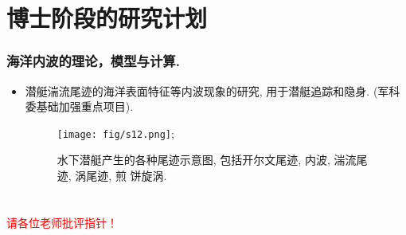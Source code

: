 \documentclass[UTF8]{ctexbeamer}	%
\theoremstyle{plain}
\theoremstyle{definition}
\theoremstyle{remark}
\numberwithin{equation}{section}
\begin{document}
\section{博士阶段的研究计划}
\begin{frame}
    \frametitle{海洋内波的理论，模型与计算.}
    \begin{itemize}
        \item 潜艇湍流尾迹的海洋表面特征等内波现象的研究, 用于潜艇追踪和隐身.
        (军科委基础加强重点项目).
        \begin{figure}
            \texttt{[image: fig/s12.png]};
            \caption{水下潜艇产生的各种尾迹示意图, 包括开尔文尾迹, 内波, 湍流尾迹, 涡尾迹, 煎
            饼旋涡.}
        \end{figure}
    \end{itemize}
\end{frame}

\section*{}
\begin{frame}
    \centering\huge
    \textcolor{red}{请各位老师批评指针！}
\end{frame}
\end{document}
